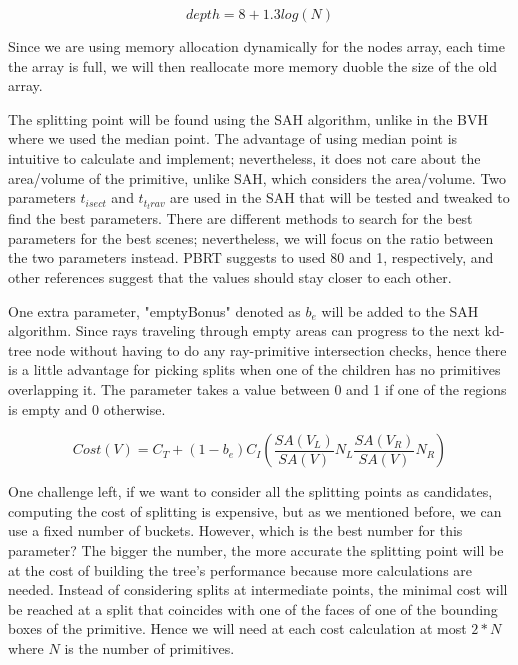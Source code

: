 \documentclass[11pt,a4paper]{article}
\begin{document}
\begin{equation}
depth = 8 + 1.3log(N)
\end{equation}


Since we are using memory allocation dynamically for the nodes array, each time the array is full, we will then reallocate more memory duoble the size of the old array.

The splitting point will be found using the SAH algorithm, unlike in the BVH where we used the median point. The advantage of using median point is intuitive to calculate and implement; nevertheless, it does not care about the area/volume of the primitive, unlike SAH, which considers the area/volume. Two parameters $t_{isect}$ and $t_{t_trav}$ are used in the SAH that will be tested and tweaked to find the best parameters. There are different methods to search for the best parameters for the best scenes; nevertheless, we will focus on the ratio between the two parameters instead. PBRT suggests to used 80 and 1, respectively, and other references suggest that the values should stay closer to each other. 


One extra parameter, "emptyBonus" denoted as $b_e$ will be added to the SAH algorithm. Since rays traveling through empty areas can progress to the next kd-tree node without having to do any ray-primitive intersection checks, hence there is a little advantage for picking splits when one of the children has no primitives overlapping it. The parameter takes a value between 0 and 1 if one of the regions is empty and 0 otherwise. 

\begin{equation}
Cost(V) = C_T + (1-b_e)C_I(\frac{SA(V_L)}{SA(V)}N_L \frac{SA(V_R)}{SA(V)}N_R)
\end{equation}

One challenge left, if we want to consider all the splitting points as candidates, computing the cost of splitting is expensive, but as we mentioned before, we can use a fixed number of buckets. However, which is the best number for this parameter? The bigger the number, the more accurate the splitting point will be at the cost of building the tree's performance because more calculations are needed. Instead of considering splits at intermediate points, the minimal cost will be reached at a split that coincides with one of the faces of one of the bounding boxes of the primitive. Hence we will need at each cost calculation at most $2 * N$ where $N$ is the number of primitives.
\end{document}
